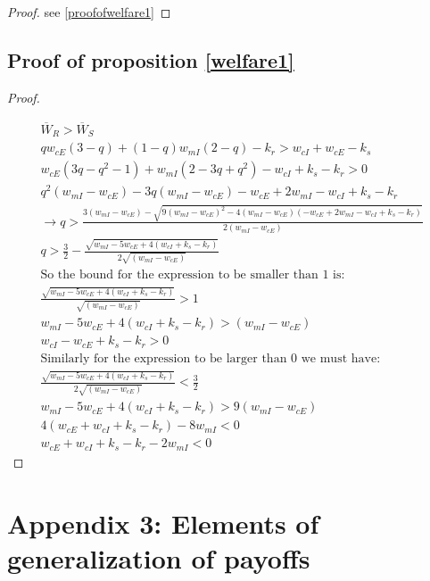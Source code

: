 \documentclass[11pt]{article}
\begin{document}
\begin{proof}
see \ref{proofofwelfare1}
\end{proof}

\subsection{Proof of proposition \ref{welfare1}}

\begin{proof}\label{proofofwelfare1}

\begin{align*}
\overline{W}_R>\overline{W}_S \\
 q w_{cE}(3-q ) 
+(1-q)w_{mI}(2-q) -k_r 
>
w_{cI}
+
w_{cE}-k_s  \\
w_{cE}(3q-q^2-1 ) 
+w_{mI}(2-3q+q^2) -w_{cI}+k_s -k_r 
>
0
\\
q^2(w_{mI}-w_{cE})
-3q(w_{mI}-w_{cE})
-w_{cE} 
+2 w_{mI} -w_{cI}+k_s -k_r 
\\
\rightarrow 
q> \frac{3(w_{mI}-w_{cE}) - \sqrt{9(w_{mI}-w_{cE})^2-4(w_{mI}-w_{cE})(-w_{cE} 
+2 w_{mI} -w_{cI}+k_s -k_r )}}{2(w_{mI}-w_{cE})} 
\\
q > \frac{3}{2} - \frac{  \sqrt{ w_{mI}-5w_{cE}+4(w_{cI}+k_s -k_r)}}{2\sqrt{(w_{mI}-w_{cE})}} \\ 
\text{So the bound for the expression to be smaller than 1 is:} \\
\frac{  \sqrt{ w_{mI}-5w_{cE}+4(w_{cI}+k_s -k_r)}}{\sqrt{(w_{mI}-w_{cE})}}  > 1 \\
 w_{mI}-5w_{cE}+4(w_{cI}+k_s -k_r)  > (w_{mI}-w_{cE}) \\
w_{cI}-w_{cE}+k_s -k_r  > 0 \\
\text{Similarly for the expression to be larger than 0 we must have:} \\
\frac{  \sqrt{ w_{mI}-5w_{cE}+4(w_{cI}+k_s -k_r)}}{2\sqrt{(w_{mI}-w_{cE})}} < \frac{3}{2} \\
 w_{mI}-5w_{cE}+4(w_{cI}+k_s -k_r) > 9(w_{mI}-w_{cE}) \\
 4(w_{cE}+w_{cI}+k_s -k_r)-8 w_{mI} < 0 \\
 w_{cE}+w_{cI}+k_s -k_r-2 w_{mI} < 0 
\end{align*}
\end{proof}

\section*{Appendix 3: Elements of generalization of payoffs}

\label{generalization}
\end{document}
